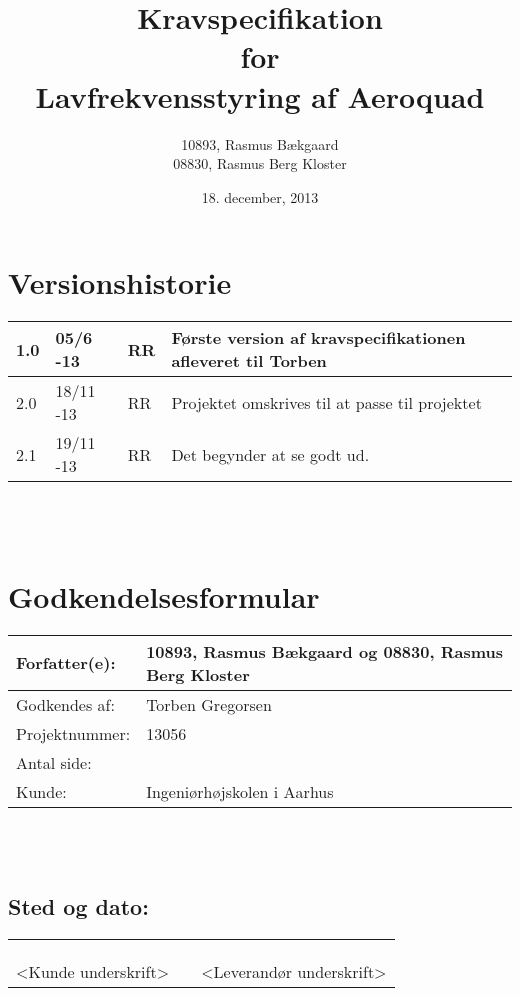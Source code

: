 \documentclass[oneside, 12pt]{memoir}
\title{Kravspecifikation \\ for \\ Lavfrekvensstyring af Aeroquad}
\date{18. december, 2013}
\author{10893, Rasmus Bækgaard\\08830, Rasmus Berg Kloster}
\begin{document}
\begin{titlingpage}
  \maketitle
\end{titlingpage}


\section*{Versionshistorie}
\begin{tabular}{l|l|l|l}
1.0 & 05/6 -13 & RR & Første version af kravspecifikationen afleveret til Torben 
\\ \hline 
2.0 & 18/11 -13 & RR & Projektet omskrives til at passe til projektet 
\\ \hline
2.1 & 19/11 -13 & RR & Det begynder at se godt ud.
\end{tabular} 
\\
\\
\section*{Godkendelsesformular}
\begin{tabular}{l|l}
\hline 
Forfatter(e): & 10893, Rasmus Bækgaard og 08830, Rasmus Berg Kloster\\ 
\hline 
Godkendes af: & Torben Gregorsen \\ 
\hline
Projektnummer: & 13056\\
\hline
Antal side: & \pageref{LastPage} \\
\hline 
Kunde: & Ingeniørhøjskolen i Aarhus \\
\hline
\end{tabular} 
\\
\\
\subsection*{Sted og dato:}
\begin{tabular}{lll}
&& \\
&& \\
\underline{\qquad \qquad \qquad \qquad \qquad} & \qquad \qquad \qquad & \underline{\qquad \qquad \qquad \qquad \qquad}  \\ 
<Kunde underskrift> & & <Leverandør underskrift> \\ 

\end{tabular} 




\newpage
\tableofcontents*
\newpage
\listoffixmes 






\newpage


\newpage
\appendix

\nocite{*}


\end{document}
